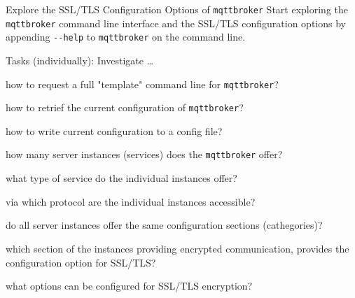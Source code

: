 \begin{frame}{Explore the SSL/TLS Configuration Options of \texttt{mqttbroker}}
     Start exploring the \alert{\texttt{mqttbroker} command line interface} and the \alert{SSL/TLS} configuration \alert{options} by appending \alert{\texttt{-{}-help}} to \texttt{mqttbroker} \alert{on the command line}.

\begin{exampleblock}{Tasks (individually): Investigate \ldots}
    \begin{description}[???]
      \item[???] how to \alert{request} a full "template" \alert{command line} for \texttt{mqttbroker}?
      \item[???] how to \alert{retrief} the current \alert{configuration} of \texttt{mqttbroker}?
      \item[???] how to \alert{write} current configuration to a \alert{config file}?
      \item[???] how many \alert{server instances} (services) does the \alert{\texttt{mqttbroker}} offer?
      \item[???] what type of \alert{service} do the \alert{individual instances} offer?
      \item[???] via \alert{which protocol} are the individual \alert{instances accessible}?
      \item[???] do all \alert{server instances} offer the same configuration \alert{sections} (cathegories)?
      \item[???] which \alert{section} of the \alert{instances} providing encrypted communication, provides the configuration option for \alert{SSL/TLS}?
      \item[???] \alert{what options} can be configured for \alert{SSL/TLS encryption}?
    \end{description}
  \end{exampleblock}
\end{frame}

